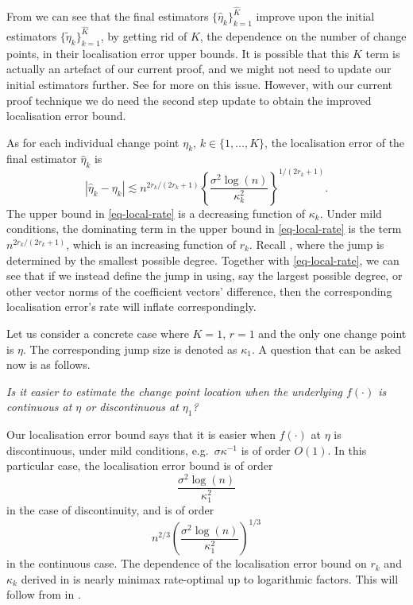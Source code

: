 \documentclass{article}
\begin{document}
From  we can see that the final estimators $\{\widehat{\eta}_k\}_{k = 1}^{\widehat{K}}$ improve upon the initial estimators $\{\widetilde{\eta}_k\}_{k = 1}^{\widehat{K}}$, by getting rid of $K$, the dependence on the number of change points, in their localisation error upper bounds.  It is possible that this $K$ term is actually an artefact of our current proof, and we might not need to update our initial estimators further.  See  for more on this issue.  However, with our current proof technique we do need the second step update to obtain the improved localisation error bound.

As for each individual change point $\eta_k$, $k \in \{1, \ldots, K\}$, the localisation error of the final estimator $\widehat{\eta}_k$ is
	\begin{equation}\label{eq-local-rate}
		|\widehat{\eta}_k - \eta_k| \lesssim n^{2r_k/(2r_k+1)} \left\{\frac{\sigma^2 \log(n)}{\kappa_k^2}\right\}^{1/(2r_k+1)}.
	\end{equation}
	The upper bound in \eqref{eq-local-rate} is a decreasing function of $\kappa_k$.  Under mild conditions, the dominating term in the upper bound in \eqref{eq-local-rate} is the term $n^{2r_k/(2r_k+1)}$, which is an increasing function of $r_k$.  Recall , where the jump is determined by the smallest possible degree.  Together with \eqref{eq-local-rate}, we can see that if we instead define the jump in  using, say the largest possible degree, or other vector norms of the coefficient vectors' difference, then the corresponding localisation error's rate will inflate correspondingly.  

Let us consider a concrete case where $K = 1$, $r = 1$ and the only one change point is $\eta$.  The corresponding jump size is denoted as $\kappa_1$.  A question that can be asked now is as follows.  
	\begin{displayquote}
		\emph{Is it easier to estimate the change point location when the underlying $f(\cdot)$ is continuous at $\eta$ or discontinuous at $\eta_1$?	}
	\end{displayquote}
	Our localisation error bound says that it is easier when $f(\cdot)$ at $\eta$ is discontinuous, under mild conditions, e.g.~$\sigma \kappa^{-1}$ is of order $O(1)$.  In this particular case, the localisation error bound is of order
	\[
		\frac{\sigma^2 \log(n)}{\kappa_1^2}
	\] 
	in the case of discontinuity, and is of order 
	\[
		n^{2/3} \left(\frac{\sigma^2 \log(n)}{\kappa_1^2}\right)^{1/3}
	\] 
	in the continuous case.    The dependence of the localisation error bound on $r_k$ and $\kappa_k$ derived in  is nearly minimax rate-optimal up to logarithmic factors.  This will follow from  in .
	
\end{document}
